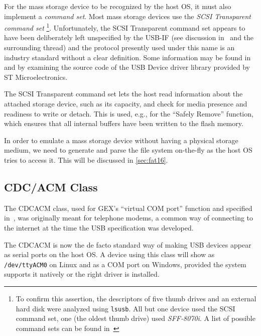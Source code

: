 For the mass storage device to be recognized by the host \gls{OS}, it must also implement a \textit{command set}. Most mass storage devices use the \textit{\gls{SCSI} Transparent command set}
\footnote{To confirm this assertion, the descriptors of five thumb drives and an external hard disk were analyzed using \verb|lsusb|. All but one device used the SCSI command set, one (the oldest thumb drive) used \textit{SFF-8070i}. A list of possible command sets can be found in~\cite{usbif-msco}}. Unfortunately, the \gls{SCSI} Transparent command set appears to have been deliberately left unspecified by the USB-IF (see discussion in~\cite{usb-tscsi-wtf} and the surrounding thread) and the protocol presently used under this name is an industry standard without a clear definition. Some information may be found in~\cite{usb-tscsi} and by examining the source code of the USB Device driver library provided by ST Microelectronics.

The \gls{SCSI} Transparent command set lets the host read information about the attached storage device, such as its capacity, and check for media presence and readiness to write or detach. This is used, e.g., for the ``Safely Remove'' function, which ensures that all internal buffers have been written to the flash memory.

In order to emulate a mass storage device without having a physical storage medium, we need to generate and parse the file system on-the-fly as the host \gls{OS} tries to access it. This will be discussed in \cref{sec:fat16}.

\subsection{CDC/ACM Class} \label{sec:cdc_acm}


The \acrshort{CDCACM} class, used for GEX's ``virtual COM port'' function and specified in~\cite{usbif-cdc}, was originally meant for telephone modems, a common way of connecting to the internet at the time the \gls{USB} specification was developed. 

The \gls{CDCACM} is now the de facto standard way of making \gls{USB} devices appear as serial ports on the host \gls{OS}. A device using this class will show as \verb|/dev/ttyACM0| on Linux and as a COM port on Windows, provided the system supports it natively or the right driver is installed.

